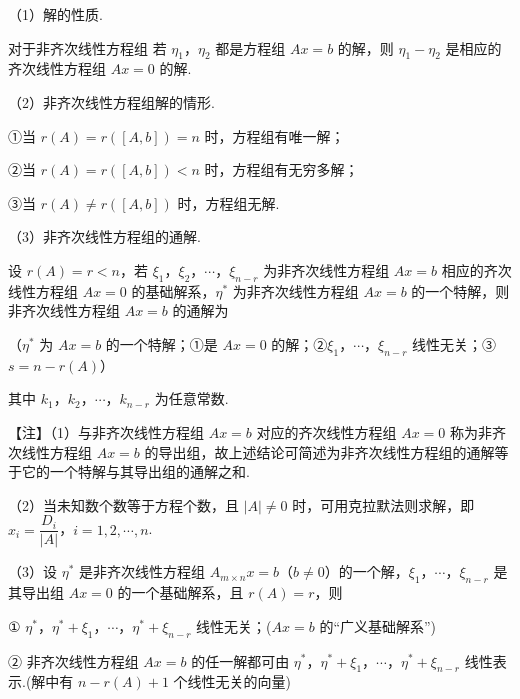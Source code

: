 
（1）解的性质.

对于非齐次线性方程组
若 $\eta_1$，$\eta_2$ 都是方程组 $Ax=b$ 的解，则 $\eta_1-\eta_2$ 是相应的齐次线性方程组 $Ax=0$ 的解.

（2）非齐次线性方程组解的情形.


①当 $r(A)=r([A,b])=n$ 时，方程组有唯一解；

②当 $r(A)=r([A,b])<n$ 时，方程组有无穷多解；

③当 $r(A)\ne r([A,b])$ 时，方程组无解.

（3）非齐次线性方程组的通解.

设 $r(A)=r<n$，若 $\xi_1$，$\xi_2$，$\cdots$，$\xi_{n-r}$ 为非齐次线性方程组 $Ax=b$ 相应的齐次线性方程组 $Ax=0$ 的基础解系，$\eta^*$ 为非齐次线性方程组 $Ax=b$ 的一个特解，则非齐次线性方程组 $Ax=b$ 的通解为

（$\eta^*$ 为 $Ax=b$ 的一个特解；①是 $Ax=0$ 的解；②$\xi_1$，$\cdots$，$\xi_{n-r}$ 线性无关；③ $s=n-r(A)$）

其中 $k_1$，$k_2$，$\cdots$，$k_{n-r}$ 为任意常数.

\begin{fnote}
【注】（1）与非齐次线性方程组 $Ax=b$ 对应的齐次线性方程组 $Ax=0$ 称为非齐次线性方程组 $Ax=b$ 的导出组，故上述结论可简述为非齐次线性方程组的通解等于它的一个特解与其导出组的通解之和.


（2）当未知数个数等于方程个数，且 $|A|\ne0$ 时，可用克拉默法则求解，即 $x_i=\dfrac{D_i}{|A|}$，$i=1,2,\cdots,n$.

（3）设 $\eta^*$ 是非齐次线性方程组 $A_{m\times n}x=b$（$b\ne0$）的一个解，$\xi_1$，$\cdots$，$\xi_{n-r}$ 是其导出组 $Ax=0$ 的一个基础解系，且 $r(A)=r$，则

① $\eta^*$，$\eta^*+\xi_1$，$\cdots$，$\eta^*+\xi_{n-r}$ 线性无关；\quad($Ax=b$ 的“广义基础解系”)

② 非齐次线性方程组 $Ax=b$ 的任一解都可由 $\eta^*$，$\eta^*+\xi_1$，$\cdots$，$\eta^*+\xi_{n-r}$ 线性表示.\quad(解中有 $n-r(A)+1$ 个线性无关的向量)
\end{fnote}


